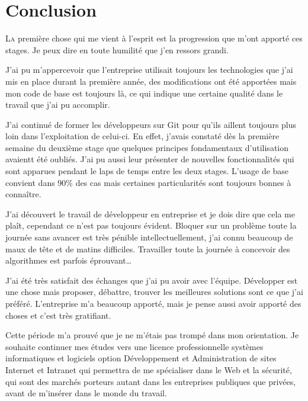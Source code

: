\chapter{Conclusion} %
\label{cha:Conclusion}

\lettrine{L}{a} première chose qui me vient à l'esprit est la
progression que m'ont apporté ces stages. Je peux dire en toute
humilité que j'en ressors grandi.

J'ai pu m'appercevoir que l'entreprise utilisait toujours les
technologies que j'ai mis en place durant la première année, des
modifications ont été apportées mais mon code de base est toujours là,
ce qui indique une certaine qualité dans le travail que j'ai pu
accomplir.

J'ai continué de former les développeurs sur Git pour qu'ils aillent
toujours plus loin dans l'exploitation de celui-ci. En effet, j'avais
constaté dès la première semaine du deuxième stage que quelques
principes fondamentaux d'utilisation avaientt été oubliés. J'ai pu aussi
leur présenter de nouvelles fonctionnalités qui sont apparues pendant le
laps de temps entre les deux stages. L'usage de base convient dans
90\%{} des cas mais certaines particularités sont toujours bonnes à
connaître.

J'ai découvert le travail de développeur en entreprise et je dois dire
que cela me plaît, cependant ce n'est pas toujours évident.  Bloquer sur
un problème toute la journée sans avancer est très pénible
intellectuellement, j'ai connu beaucoup de maux de tête et de matins
difficiles. Travailler toute la journée à concevoir des algorithmes est
parfois éprouvant\dots

J'ai été très satisfait des échanges que j'ai pu avoir avec l'équipe.
Développer est une chose mais proposer, débattre, trouver les meilleures
solutions sont ce que j'ai préféré. L'entreprise m'a beaucoup apporté,
mais je pense aussi avoir apporté des choses et c'est très gratifiant.

Cette période m'a prouvé que je ne m'étais pas trompé dans mon
orientation. Je souhaite continuer mes études vers une licence
professionnelle systèmes informatiques et logiciels option \og
Développement et Administration de sites Internet et Intranet \fg{} qui
permettra de me spécialiser dans le Web et la sécurité, qui sont des
marchés porteurs autant dans les entreprises publiques que privées,
avant de m'insérer dans le monde du travail.
